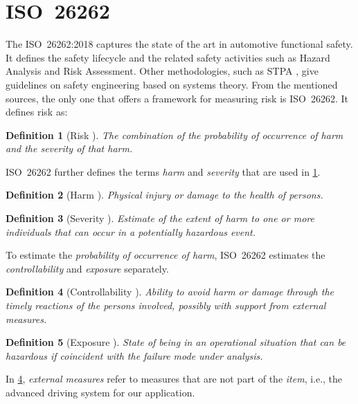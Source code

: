 \documentclass[10pt,final,a4paper,oneside,onecolumn]{article}
\theoremstyle{plain}\newtheorem{definition}{Definition}[section]    %
\theoremstyle{definition}\newtheorem{example}{Example}[section]     %
\theoremstyle{remark}\newtheorem{remarkenv}{Remark}[section]        %
\begin{document}
\section{ISO~26262}
\label{sec:iso26262}

The ISO~26262:2018 \cite{ISO26262} captures the state of the art in automotive functional safety. It defines the safety lifecycle and the related safety activities such as Hazard Analysis and Risk Assessment. Other methodologies, such as STPA \cite{leveson2018stpa}, give guidelines on safety engineering based on systems theory. From the mentioned sources, the only one that offers a framework for measuring risk is ISO~26262. It defines risk as:
\begin{definition}[Risk \cite{ISO26262}]
	\label{def:risk}
	The combination of the probability of occurrence of harm and the severity of that harm.
\end{definition}

ISO~26262 further defines the terms \emph{harm} and \emph{severity} that are used in \cref{def:risk}.
\begin{definition}[Harm \cite{ISO26262}]
	\label{def:harm}
	Physical injury or damage to the health of persons.
\end{definition}
\begin{definition}[Severity \cite{ISO26262}]
	\label{def:severity}
	Estimate of the extent of harm to one or more individuals that can occur in a potentially hazardous event.
\end{definition}

To estimate the \emph{probability of occurrence of harm}, ISO~26262 estimates the \emph{controllability} and \emph{exposure} separately. 

\begin{definition}[Controllability \cite{ISO26262}]
	\label{def:controllability}
	Ability to avoid harm or damage through the timely reactions of the persons involved, possibly with support from external measures.
\end{definition}
\begin{definition}[Exposure \cite{ISO26262}]
	\label{def:exposure}
	State of being in an operational situation that can be hazardous if coincident with the failure mode under analysis.
\end{definition}

In \cref{def:controllability}, \emph{external measures} refer to measures that are not part of the \emph{item}, i.e., the advanced driving system for our application.
\end{document}
